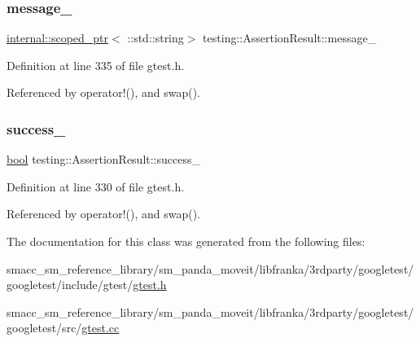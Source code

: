 \subsubsection{\texorpdfstring{message\+\_\+}{message\_}}
{\footnotesize\ttfamily \hyperlink{classtesting_1_1internal_1_1scoped__ptr}{internal\+::scoped\+\_\+ptr}$<$ \+::std\+::string$>$ testing\+::\+Assertion\+Result\+::message\+\_\+\hspace{0.3cm}{\ttfamily [private]}}



Definition at line 335 of file gtest.\+h.



Referenced by operator!(), and swap().

\mbox{\label{classtesting_1_1AssertionResult_ae7348f9fffe7a20980dfc94fc261d7ca}} 
\subsubsection{\texorpdfstring{success\+\_\+}{success\_}}
{\footnotesize\ttfamily \hyperlink{classbool}{bool} testing\+::\+Assertion\+Result\+::success\+\_\+\hspace{0.3cm}{\ttfamily [private]}}



Definition at line 330 of file gtest.\+h.



Referenced by operator!(), and swap().



The documentation for this class was generated from the following files\+:\begin{DoxyCompactItemize}
\item 
smacc\+\_\+sm\+\_\+reference\+\_\+library/sm\+\_\+panda\+\_\+moveit/libfranka/3rdparty/googletest/googletest/include/gtest/\hyperlink{gtest_8h}{gtest.\+h}\item 
smacc\+\_\+sm\+\_\+reference\+\_\+library/sm\+\_\+panda\+\_\+moveit/libfranka/3rdparty/googletest/googletest/src/\hyperlink{gtest_8cc}{gtest.\+cc}\end{DoxyCompactItemize}
